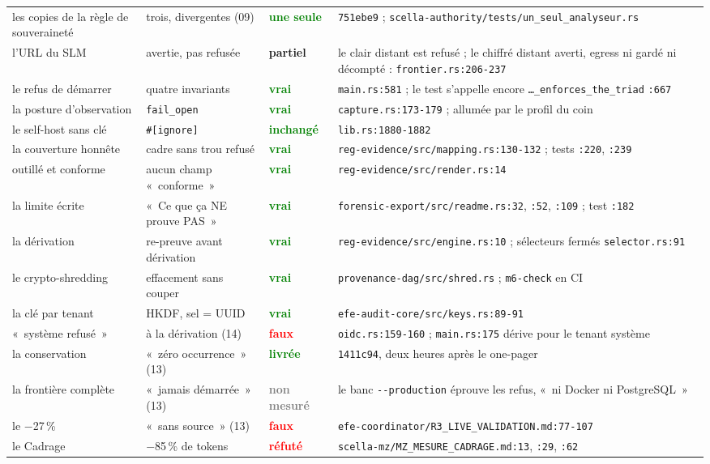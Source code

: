 \documentclass[10pt]{article}
\newcommand{\code}[1]{\texttt{\small #1}}
\newcommand{\loc}[1]{{\footnotesize\color{grey}\texttt{#1}}}
\newcommand{\ok}[1]{\textcolor{green}{\textbf{#1}}}
\newcommand{\ko}[1]{\textcolor{red}{\textbf{#1}}}
\newcommand{\att}[1]{\textcolor{amber}{\textbf{#1}}}
\newcommand{\nm}[1]{\textcolor{grey}{\textbf{#1}}}
\newcommand{\pc}{\,\%}
\begin{document}
{\begin{longtable}{@{}L{3.3cm}L{4.2cm}L{2.2cm}L{7.0cm}@{}}
les copies de la règle de souveraineté & trois, divergentes (09) & \ok{une seule} & \code{751ebe9} ; \loc{scella-authority/tests/un\_seul\_analyseur.rs} \\
l'URL du SLM & avertie, pas refusée & \att{partiel} & le clair distant est refusé ; le chiffré distant averti, egress ni gardé ni décompté : \loc{frontier.rs:206-237} \\
le refus de démarrer & quatre invariants & \ok{vrai} & \loc{main.rs:581} ; le test s'appelle encore \code{…\_enforces\_the\_triad} \loc{:667} \\
la posture d'observation & \code{fail\_open} & \ok{vrai} & \loc{capture.rs:173-179} ; allumée par le profil du coin \\
le self-host sans clé & \code{\#[ignore]} & \ok{inchangé} & \loc{lib.rs:1880-1882} \\
la couverture honnête & cadre sans trou refusé & \ok{vrai} & \loc{reg-evidence/src/mapping.rs:130-132} ; tests \loc{:220}, \loc{:239} \\
outillé et conforme & aucun champ «~conforme~» & \ok{vrai} & \loc{reg-evidence/src/render.rs:14} \\
la limite écrite & «~Ce que ça NE prouve PAS~» & \ok{vrai} & \loc{forensic-export/src/readme.rs:32}, \loc{:52}, \loc{:109} ; test \loc{:182} \\
la dérivation & re-preuve avant dérivation & \ok{vrai} & \loc{reg-evidence/src/engine.rs:10} ; sélecteurs fermés \loc{selector.rs:91} \\
le crypto-shredding & effacement sans couper & \ok{vrai} & \loc{provenance-dag/src/shred.rs} ; \code{m6-check} en CI \\
la clé par tenant & HKDF, sel = UUID & \ok{vrai} & \loc{efe-audit-core/src/keys.rs:89-91} \\
«~système refusé~» & à la dérivation (14) & \ko{faux} & \loc{oidc.rs:159-160} ; \loc{main.rs:175} dérive pour le tenant système \\
la conservation & «~zéro occurrence~» (13) & \ok{livrée} & \code{1411c94}, deux heures après le one-pager \\
la frontière complète & «~jamais démarrée~» (13) & \nm{non mesuré} & le banc \code{-{}-production} éprouve les refus, «~ni Docker ni PostgreSQL~» \\
le $-$27\pc{} & «~sans source~» (13) & \ko{faux} & \loc{efe-coordinator/R3\_LIVE\_VALIDATION.md:77-107} \\
le Cadrage & $-$85\pc{} de tokens & \ko{réfuté} & \loc{scella-mz/MZ\_MESURE\_CADRAGE.md:13}, \loc{:29}, \loc{:62} \\

\end{longtable}}
\end{document}
